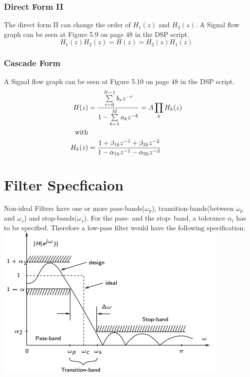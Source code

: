 \documentclass[accentcolor=tud4c,9.5pt,nochapname,bigchapter,paper=a5report]{tudreport}
\begin{document}
\subsubsection{Direct Form II}
The direct form II can change the order of $H_1(z)$ and $H_2(z)$. A Signal flow graph can be seen at Figure 5.9 on page 48 in the DSP script.
\begin{equation}
H_1(z)H_2(z)=H(z)=H_2(z)H_1(z)
\end{equation}
\subsubsection{Cascade Form}
A Signal flow graph can be seen at Figure 5.10 on page 48 in the DSP script.
\begin{subequations}
\begin{align}
H(z)&=\frac{\sum\limits_{r=0}^{N-1}b_rz^{-r}}{1-\sum\limits_{k=1}^{M}a_k z^{-k}}=A\prod\limits_k H_k(z)\\
\text{with} \notag\\
H_k(z)&=\frac{1+\beta_{1k}z^{-1}+\beta_{2k}z^{-2}}{1-\alpha_{1k}z^{-1}-\alpha_{2k}z^{-2}}
\end{align}
\end{subequations}

\section {Filter Specficaion}
Non-ideal Filters have one or more pass-bands($\omega_p$), 
transition-bands(between $\omega_p$ and $\omega_s$) and stop-bands($\omega_s$). 
For the pass- and the stop- band, a tolerance
$\alpha_i$ has to be specified. Therefore a low-pass filter would have the following specification:
\includegraphics[width=\textwidth]{images/filter_spec.png}
\end{document}
